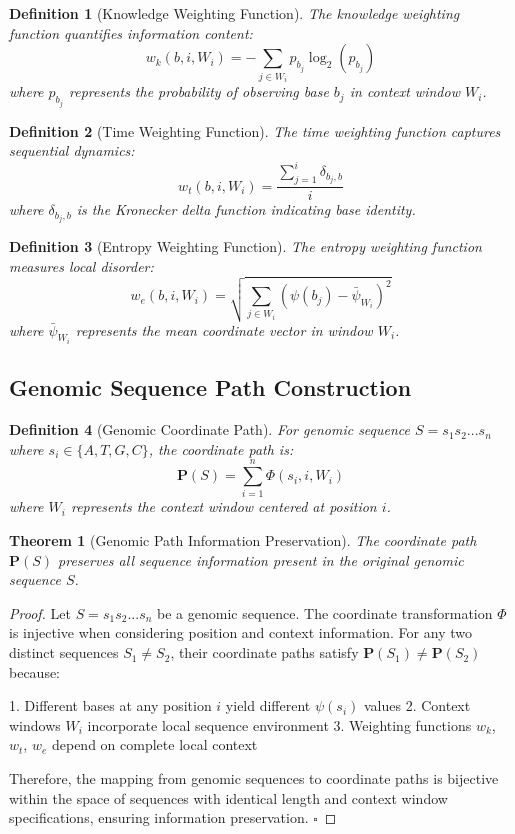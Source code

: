 \documentclass[12pt,a4paper]{article}
\newtheorem{theorem}{Theorem}
\newtheorem{definition}{Definition}
\begin{document}
\begin{definition}[Knowledge Weighting Function]
The knowledge weighting function quantifies information content:
$$w_k(b,i,W_i) = -\sum_{j \in W_i} p_{b_j} \log_2(p_{b_j})$$
where $p_{b_j}$ represents the probability of observing base $b_j$ in context window $W_i$.
\end{definition}

\begin{definition}[Time Weighting Function]
The time weighting function captures sequential dynamics:
$$w_t(b,i,W_i) = \frac{\sum_{j=1}^{i} \delta_{b_j,b}}{i}$$
where $\delta_{b_j,b}$ is the Kronecker delta function indicating base identity.
\end{definition}

\begin{definition}[Entropy Weighting Function]
The entropy weighting function measures local disorder:
$$w_e(b,i,W_i) = \sqrt{\sum_{j \in W_i} (\psi(b_j) - \bar{\psi}_{W_i})^2}$$
where $\bar{\psi}_{W_i}$ represents the mean coordinate vector in window $W_i$.
\end{definition}

\subsection{Genomic Sequence Path Construction}

\begin{definition}[Genomic Coordinate Path]
For genomic sequence $S = s_1s_2...s_n$ where $s_i \in \{A,T,G,C\}$, the coordinate path is:
$$\mathbf{P}(S) = \sum_{i=1}^n \Phi(s_i, i, W_i)$$
where $W_i$ represents the context window centered at position $i$.
\end{definition}

\begin{theorem}[Genomic Path Information Preservation]
The coordinate path $\mathbf{P}(S)$ preserves all sequence information present in the original genomic sequence $S$.
\end{theorem}

\begin{proof}
Let $S = s_1s_2...s_n$ be a genomic sequence. The coordinate transformation $\Phi$ is injective when considering position and context information. For any two distinct sequences $S_1 \neq S_2$, their coordinate paths satisfy $\mathbf{P}(S_1) \neq \mathbf{P}(S_2)$ because:

1. Different bases at any position $i$ yield different $\psi(s_i)$ values
2. Context windows $W_i$ incorporate local sequence environment
3. Weighting functions $w_k$, $w_t$, $w_e$ depend on complete local context

Therefore, the mapping from genomic sequences to coordinate paths is bijective within the space of sequences with identical length and context window specifications, ensuring information preservation. $\square$
\end{proof}
\end{document}

